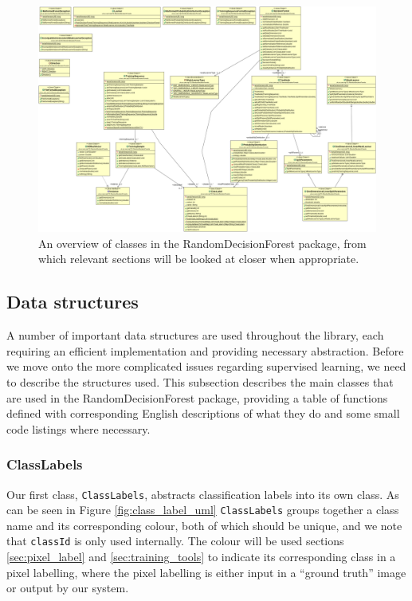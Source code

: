 \documentclass[12pt,twoside,notitlepage]{report}
\begin{document}
        \begin{figure}[H]
            \centering
            \includegraphics[scale=0.25, angle=90]{Forest_UML}
            \caption{An overview of classes in the RandomDecisionForest package, from which relevant sections will be 
            looked at closer when appropriate.}
            \label{fig:forest_uml}
        \end{figure}

        \subsection{Data structures}
            A number of important data structures are used throughout the library, each requiring an efficient 
            implementation and providing necessary abstraction. Before we move onto the more complicated issues 
            regarding supervised learning, we need to describe the structures used. This subsection 
            describes the main classes that are used in the RandomDecisionForest package, providing a table of 
            functions defined with corresponding English descriptions of what they do and some small code listings 
            where necessary.



            \subsubsection{ClassLabels}
                Our first class, \texttt{ClassLabels}, abstracts classification labels into its own class. As can be 
                seen in Figure \ref{fig:class_label_uml} \texttt{ClassLabels} groups together a class name and its 
                corresponding colour, both of which should be unique, and we note that \texttt{classId} is only used 
                internally. The colour will be used sections 
                \ref{sec:pixel_label} and \ref{sec:training_tools} to indicate its corresponding class in a pixel 
                labelling, where the pixel labelling is either input in a ``ground truth'' image or output by our system.                
\end{document}
